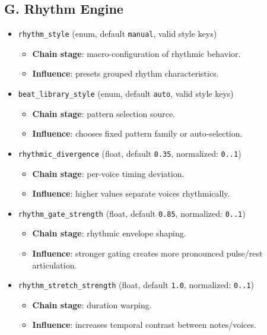 \documentclass[11pt,a4paper]{article}
\begin{document}
\subsection*{G. Rhythm Engine}
\begin{itemize}
  \item \texttt{rhythm\_style} (enum, default \texttt{manual}, valid style keys)
  \begin{itemize}
    \item \textbf{Chain stage}: macro-configuration of rhythmic behavior.
    \item \textbf{Influence}: presets grouped rhythm characteristics.
  \end{itemize}

  \item \texttt{beat\_library\_style} (enum, default \texttt{auto}, valid style keys)
  \begin{itemize}
    \item \textbf{Chain stage}: pattern selection source.
    \item \textbf{Influence}: chooses fixed pattern family or auto-selection.
  \end{itemize}

  \item \texttt{rhythmic\_divergence} (float, default \texttt{0.35}, normalized: \texttt{0..1})
  \begin{itemize}
    \item \textbf{Chain stage}: per-voice timing deviation.
    \item \textbf{Influence}: higher values separate voices rhythmically.
  \end{itemize}

  \item \texttt{rhythm\_gate\_strength} (float, default \texttt{0.85}, normalized: \texttt{0..1})
  \begin{itemize}
    \item \textbf{Chain stage}: rhythmic envelope shaping.
    \item \textbf{Influence}: stronger gating creates more pronounced pulse/rest articulation.
  \end{itemize}

  \item \texttt{rhythm\_stretch\_strength} (float, default \texttt{1.0}, normalized: \texttt{0..1})
  \begin{itemize}
    \item \textbf{Chain stage}: duration warping.
    \item \textbf{Influence}: increases temporal contrast between notes/voices.
  \end{itemize}


\end{itemize}
\end{document}
